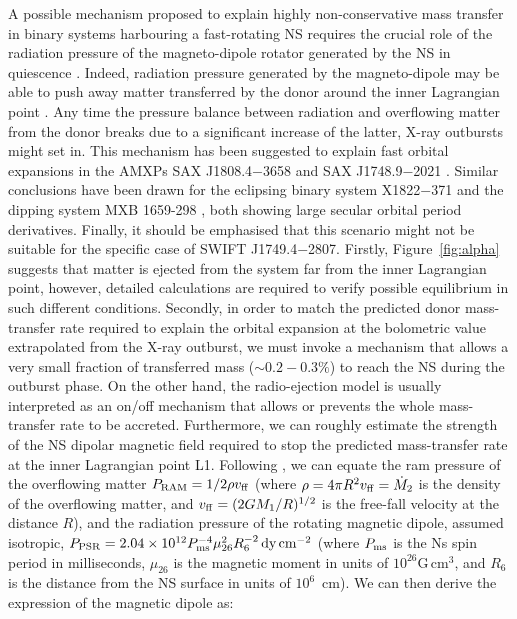 \documentclass[fleqn,usenatbib]{mnras}
\newcommand{\swiftj}{SWIFT J1749.4$-$2807}
\begin{document}
A possible mechanism proposed to explain highly non-conservative mass transfer in binary systems harbouring a fast-rotating NS requires the crucial role of the radiation pressure of the magneto-dipole rotator generated by the NS in quiescence \citep[see e.g.,][]{Burderi:2003wk,di-Salvo:2008uu}. Indeed, radiation pressure generated by the magneto-dipole may be able to push away matter transferred by the donor around the inner Lagrangian point \citep[radio-ejection, see e.g.,][for a detailed discussion on the model]{Burderi:2001wp, di-Salvo:2008uu}. Any time the pressure balance between radiation and overflowing matter from the donor breaks due to a significant increase of the latter, X-ray outbursts might set in. This mechanism has been suggested to explain fast orbital expansions in the AMXPs SAX J1808.4$-$3658 \citep[see e.g.,][]{di-Salvo:2008uu,Burderi:2009td,Sanna:2017vj} and SAX J1748.9$-$2021 \citep[][]{Sanna:2016ty}. Similar conclusions have been drawn for the eclipsing binary system X1822$-$371 \citep{Burderi:2010tk,Iaria:2015ut} and the dipping system MXB 1659-298 \citep{Iaria:2018tq}, both showing large secular orbital period derivatives. Finally, it should be emphasised that this scenario might not be suitable for the specific case of \swiftj{}. Firstly, Figure~\ref{fig:alpha} suggests that matter is ejected from the system far from the inner Lagrangian point, however, detailed calculations are required to verify possible equilibrium in such different conditions. Secondly, in order to match the predicted donor mass-transfer rate required to explain the orbital expansion at the bolometric value extrapolated from the X-ray outburst, we must invoke a mechanism that allows a very small fraction of transferred mass ($\sim0.2-0.3\%$) to reach the NS during the outburst phase. On the other hand, the radio-ejection model is usually interpreted as an on/off mechanism that allows or prevents the whole mass-transfer rate to be accreted. Furthermore, we can roughly estimate the strength of the NS dipolar magnetic field required to stop the predicted mass-transfer rate at the inner Lagrangian point L1. Following \citet{Burderi:2002wk}, we can equate the ram pressure of the overflowing matter $P_{\rm RAM}=1/2 \rho v_{\rm ff}$ (where $\rho = 4 \pi R^2 v_{\rm ff}=\dot{M}_2$ is the density of the overflowing matter, and $v_{\rm ff}=(2 G M_1/R)^{1/2}$ is the free-fall velocity at the distance $R$), and the radiation pressure of the rotating magnetic dipole, assumed isotropic, $P_{\rm PSR}=2.04\times 10^{12} P^{-4}_{\rm ms}\mu^2_{26}R^{-2}_{6}\,\text{dy}\,\text{cm}^{-2}$ (where $P_{\rm ms}$ is the Ns spin period in milliseconds, $\mu_{26}$ is the magnetic moment in units of $10^{26}\text{G}\,\text{cm}^3$, and $R_{6}$ is the distance from the NS surface in units of $10^{6}$~cm). We can then derive the expression of the magnetic dipole as:
\end{document}
